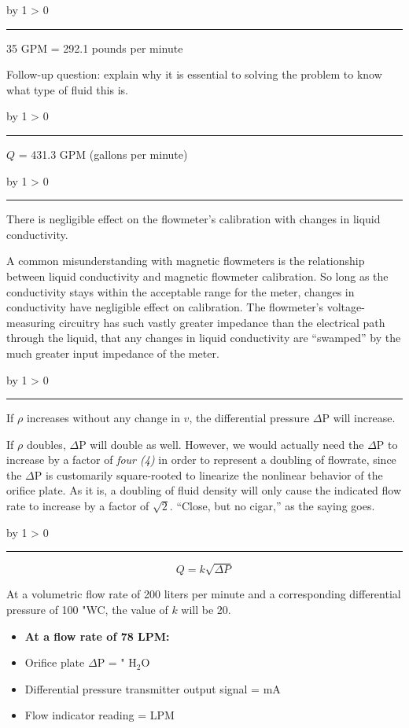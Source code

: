 \documentclass[12pt,a4paper]{article}
\def\svar{
           \advance\answnum by 1
           \ifnum \answnum > 0
                \hrule
                \vskip 3pt
                \leftline{Svar \the\answnum}
                \vskip 3pt \fi}
\begin{document}
\vskip 10pt \filbreak 
\svar{} 

35 GPM = 292.1 pounds per minute

\vskip 10pt

Follow-up question: explain why it is essential to solving the problem to know what type of fluid this is.

\vskip 10pt \filbreak 
\svar{} 

$Q$ = 431.3 GPM (gallons per minute)

\vskip 10pt \filbreak 
\svar{} 

There is negligible effect on the flowmeter's calibration with changes in liquid conductivity.

\vskip 10pt

A common misunderstanding with magnetic flowmeters is the relationship between liquid conductivity and magnetic flowmeter calibration.  So long as the conductivity stays within the acceptable range for the meter, changes in conductivity have negligible effect on calibration.  The flowmeter's voltage-measuring circuitry has such vastly greater impedance than the electrical path through the liquid, that any changes in liquid conductivity are ``swamped'' by the much greater input impedance of the meter.

\vskip 10pt \filbreak 
\svar{} 

If $\rho$ increases without any change in $v$, the differential pressure $\Delta$P will increase.

\vskip 10pt

If $\rho$ doubles, $\Delta$P will double as well.  However, we would actually need the $\Delta$P to increase by a factor of {\it four (4)} in order to represent a doubling of flowrate, since the $\Delta$P is customarily square-rooted to linearize the nonlinear behavior of the orifice plate.  As it is, a doubling of fluid density will only cause the indicated flow rate to increase by a factor of $\sqrt{2}$.  ``Close, but no cigar,'' as the saying goes.

\vskip 10pt \filbreak 
\svar{} 

$$Q = k \sqrt{\Delta P}$$

At a volumetric flow rate of 200 liters per minute and a corresponding differential pressure of 100 "WC, the value of $k$ will be 20.

\begin{itemize}
\item {} {\bf At a flow rate of 78 LPM:}
\vskip 5pt
\item{} Orifice plate $\Delta$P =  " H$_{2}$O
\vskip 5pt
\item{} Differential pressure transmitter output signal =  mA
\vskip 5pt
\item{} Flow indicator reading =  LPM
\end{itemize}
\end{document}
